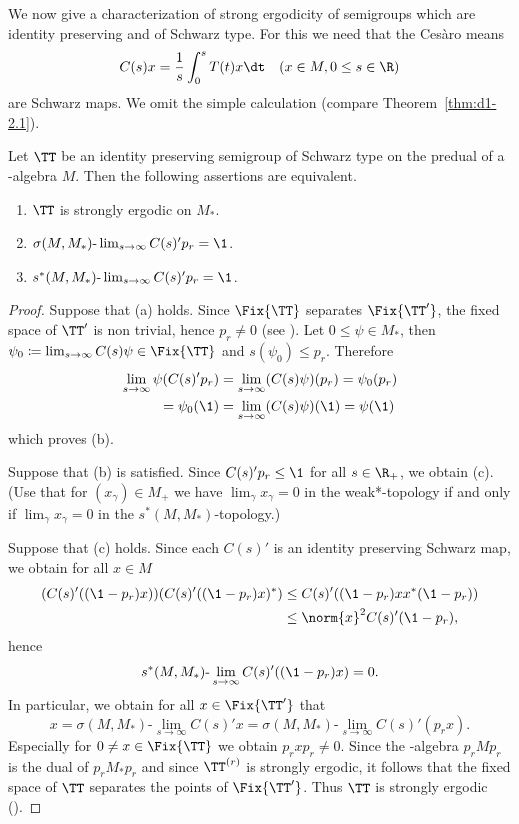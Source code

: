 We now give a characterization of strong ergodicity of semigroups which are identity preserving and of Schwarz type.
For this we need that the Cesàro means
\[
C(s)x = \frac{1}{s}\int_{0}^{s} T(t)x \dt \quad (x \in M, 0 \leq s \in \R)
\]
are Schwarz maps.
We omit the simple calculation (compare Theorem~\ref{thm:d1-2.1}).
\begin{proposition}\label{prop:d4-3.3}
Let $\TT$ be an identity preserving semigroup of Schwarz type on the predual of a \WA-algebra $M$.
Then the following assertions are equivalent.
\begin{enumerate}[\upshape (a)]
\item
$\TT$ is strongly ergodic on $M_{*}$.

\item
$\sigma(M,M_{*})\text{-}\lim_{s \to \infty} C(s)'p_{r} = \1$.

\item
$s^{*}(M,M_{*})\text{-}\lim_{s \to \infty} C(s)'p_{r} = \1$.
\end{enumerate}
\end{proposition}
\begin{proof}
Suppose that (a) holds.
Since $\Fix{\TT}$ separates $\Fix{\TT'}$, the fixed space of\/ $\TT'$ is non trivial, hence $p_{r} \neq 0$ (see \textcite[Chap.2, Theorem1.4]{krengel:1985}).
Let $0 \leq \psi \in M_{*}$, then $\psi_{0} \coloneqq \lim_{s \to \infty} C(s)\psi \in \Fix{\TT}$ and $s(\psi_{0}) \leq p_{r}$.
Therefore
\begin{align*}
\lim_{s \to \infty} \psi(C(s)'p_{r}) &= \lim_{s \to \infty} (C(s)\psi)(p_{r})  = \psi_{0}(p_{r})  \\
= \psi_{0}(\1) &= \lim_{s \to \infty} (C(s)\psi)(\1) = \psi(\1)
\end{align*}
which proves (b).

Suppose that (b) is satisfied.
Since $C(s)'p_{r} \leq \1$ for all $s \in \R_{+}$, we obtain (c).
(Use that for $(x_{\gamma}) \in M_{+}$ we have $\lim_{\gamma}x_{\gamma} = 0$ in the weak*-topology if and only if\/ $\lim_{\gamma}x_{\gamma} = 0$ in the $s^{*}(M,M_{*})$-topology.)

Suppose that (c) holds.
Since each $C(s)'$ is an identity preserving Schwarz map, we obtain for all $x \in M$
\begin{align*}
	\mleft( C(s)'((\1-p_{r})x))(C(s)'((\1-p_{r})x)^{*} \mright) 
			&\leq C(s)'((\1-p_{r})xx^{*}(\1-p_{r}))  \\
 	&\leq \norm{x}^2 C(s)'(\1-p_{r}),
\end{align*}
hence
\[
s^{*}(M,M_{*})\text{-}\lim_{s \to \infty} C(s)'((\1-p_{r})x) = 0.
\]
In particular, we obtain for all $x \in \Fix{\TT'}$ that 
\[
x = \sigma(M,M_{*})\text{-}\lim_{s \to \infty} C(s)'x = \sigma(M,M_{*})\text{-}\lim_{s \to \infty} C(s)'(p_{r}x) .
\]
Especially for $0 \neq x \in \Fix{\TT}$ we obtain $p_{r}xp_{r} \neq 0$.
Since the \WA-algebra $p_{r}Mp_{r}$ is the dual of\/ $p_{r}M_{*}p_{r}$ and since $\TT^{(r)}$ is strongly ergodic, it follows that the fixed space of\/ $\TT$ separates the points of\/ $\Fix{\TT'}$.
Thus $\TT$ is strongly ergodic (\textcite[Chap. 2, Theorem 1.4]{krengel:1985}).
\end{proof}
